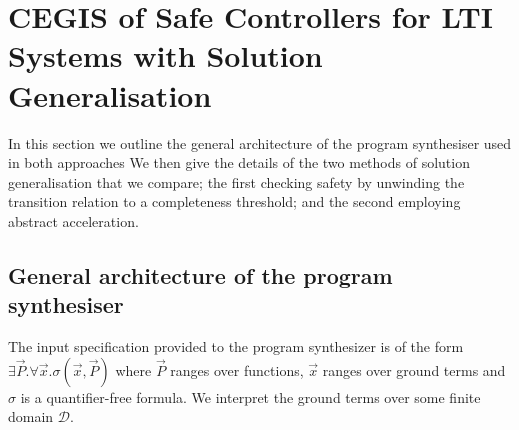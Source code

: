 \documentclass[runningheads,a4paper]{llncs}
\begin{document}


\section{CEGIS of Safe Controllers for LTI Systems with Solution Generalisation} 
\label{sec:CEGARIS} 
In this section we outline the general architecture of the program synthesiser used in both approaches%
We then give the details of the two methods of solution generalisation that we compare; the first checking safety by unwinding the transition relation to a completeness threshold; and the second employing abstract acceleration.
 
\subsection{General architecture of the program synthesiser}
\label{synthesizer-general}
The input specification provided to the program synthesizer is of the form
$\exists \vec{P} .  \forall \vec{x}.  \sigma(\vec{x}, \vec{P})$ where
$\vec{P}$ ranges over functions, $\vec{x}$ 
 ranges over ground terms and
$\sigma$ is a quantifier-free formula.  We interpret the ground terms over
some finite domain $\mathcal{D}$.
\end{document}
